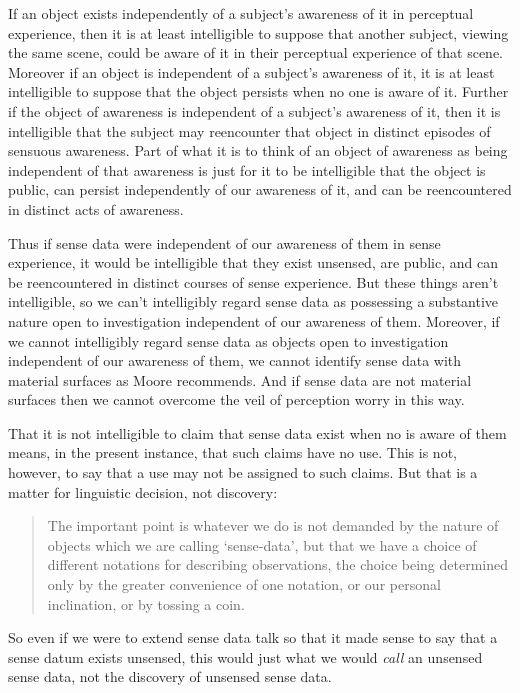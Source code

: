 \documentclass[11pt]{article}
\begin{document}
If an object exists independently of a subject's awareness of it in perceptual experience, then it is at least intelligible to suppose that another subject, viewing the same scene, could be aware of it in their perceptual experience of that scene. Moreover if an object is independent of a subject's awareness of it, it is at least intelligible to suppose that the object persists when no one is aware of it. Further if the object of awareness is independent of a subject's awareness of it, then it is intelligible that the subject may reencounter that object in distinct episodes of sensuous awareness. Part of what it is to think of an object of awareness as being independent of that awareness is just for it to be intelligible that the object is public, can persist independently of our awareness of it, and can be reencountered in distinct acts of awareness. 

Thus if sense data were independent of our awareness of them in sense experience, it would be intelligible that they exist unsensed, are public, and can be reencountered in distinct courses of sense experience. But these things aren't intelligible, so we can't intelligibly regard sense data as possessing a substantive nature open to investigation independent of our awareness of them. Moreover, if we cannot intelligibly regard sense data as objects open to investigation independent of our awareness of them, we cannot identify sense data with material surfaces as Moore recommends. And if sense data are not material surfaces then we cannot overcome the veil of perception worry in this way.

That it is not intelligible to claim that sense data exist when no is aware of them means, in the present instance, that such claims have no use. This is not, however, to say that a use may not be assigned to such claims. But that is a matter for linguistic decision, not discovery:
\begin{quote}
	The important point is whatever we do is not demanded by the nature of objects which we are calling `sense-data', but that we have a choice of different notations for describing observations, the choice being determined only by the greater convenience of one notation, or our personal inclination, or by tossing a coin.\citep[]{Paul:1936kd}
\end{quote}
So even if we were to extend sense data talk so that it made sense to say that a sense datum exists unsensed, this would just what we would \emph{call} an unsensed sense data, not the discovery of unsensed sense data.
\end{document}
